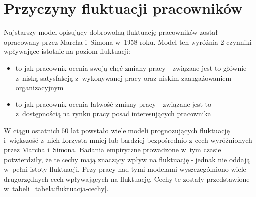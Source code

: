 \section{Przyczyny fluktuacji pracowników}\label{sec:czynniki-wplywajace-na-fluktuacje}

Najstarszy model opisujący dobrowolną fluktuację pracowników został opracowany przez Marcha i~Simona w~1958 roku.
Model ten wyróżnia 2 czynniki wpływające istotnie na poziom fluktuacji\cite{wozniak-2012}:
\begin{itemize}
    \item to jak pracownik ocenia swoją chęć zmiany pracy - związane jest to głównie z~niską satysfakcją z~wykonywanej pracy oraz niskim zaangażowaniem organizacyjnym
    \item to jak pracownik ocenia łatwość zmiany pracy - związane jest to z~dostępnością na rynku pracy posad interesujących pracownika
\end{itemize}
W ciągu ostatnich 50 lat powstało wiele modeli prognozujących fluktuację i~większość z~nich korzysta mniej lub bardziej bezpośrednio z~cech wyróżnionych przez Marcha i~Simona.
Badania empiryczne prowadzone w~tym czasie potwierdziły, że te cechy mają znaczący wpływ na fluktuację - jednak nie oddają w~pełni istoty fluktuacji.
Przy pracy nad tymi modelami wyszczególniono wiele drugorzędnych cech wpływających na fluktuację.
Cechy te zostały przedstawione w~tabeli~\ref{tabela:fluktuacja-cechy}.

